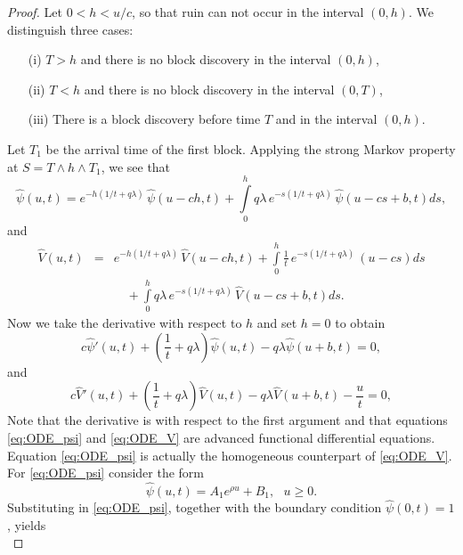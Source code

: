\begin{proof}
Let $0<h<u/c$, so that ruin can not occur in the interval $(0,h)$. We distinguish three cases:
\begin{itemize}
  \item[(i)] $T>h$ and there is no block discovery in the interval $(0,h)$,
  \item[(ii)] $T<h$ and there is no block discovery in the interval $(0,T)$,
  \item[(iii)] There is a block discovery before time $T$ and in the interval $(0,h)$. 
\end{itemize}
Let $T_1$ be the arrival time of the first block. Applying the strong Markov property at $S = T\land h\land T_1$, we see that 
\begin{equation*}
  \widehat{\psi}(u,t)=e^{-h(1/t + q\lambda)}\,\widehat{\psi}(u-ch,t) +\int\limits_0^h q\lambda\, e^{-s(1/t + q\lambda)}\,\widehat{\psi}(u-cs+b,t)ds,
  \end{equation*}
and 
\begin{eqnarray*}
  \widehat{V}(u,t)& =&e^{-h(1/t + q\lambda)}\,\widehat{V}(u-ch,t)+\int\limits_0^h\frac1t\, e^{-s(1/t + q\lambda)}\,(u-cs)ds\\
  &&\quad+\int\limits_0^h q\lambda\, e^{-s(1/t + q\lambda)}\,\widehat{V}(u-cs+b,t)ds.
  \end{eqnarray*}
Now we take the derivative with respect to $h$ and set $h=0$ to obtain
\begin{equation}\label{eq:ODE_psi}
c\widehat{\psi}'(u,t) + \left(\frac{1}{t} +  q\lambda\right)\widehat{\psi}(u,t) - q\lambda \widehat{\psi}(u+b,t)=0,
\end{equation}
 and
\begin{equation}\label{eq:ODE_V}
c\widehat{V}'(u,t) + \left(\frac{1}{t} +  q\lambda\right)\widehat{V}(u,t) - q\lambda \widehat{V}(u+b,t) - \frac{u}{t} =0,
\end{equation}
Note that the derivative is with respect to the first argument and that equations \eqref{eq:ODE_psi} and \eqref{eq:ODE_V} are advanced functional differential equations. Equation \eqref{eq:ODE_psi} is actually the homogeneous counterpart of \eqref{eq:ODE_V}. For \eqref{eq:ODE_psi} consider the form 
\begin{equation}\label{eq:potential_solution_psi}
\widehat{\psi}(u,t) = A_1e^{\rho u } + B_1,\text{ }u \ge 0. 
\end{equation}
Substituting in \eqref{eq:ODE_psi}, together with the boundary condition $\widehat{\psi}(0,t) = 1$, yields
\begin{equation*}

\end{equation*}
\end{proof}
